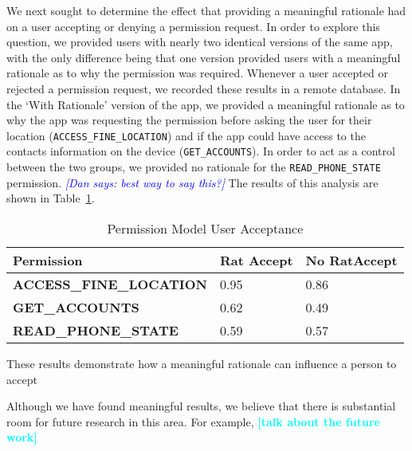 \documentclass{sig-alternate-05-2015}
\newcommand{\todo}[1]{\textcolor{cyan}{\textbf{[#1]}}}
\newcommand{\dan}[1]{\textcolor{blue}{{\it [Dan says: #1]}}}
\begin{document}
We next sought to determine the effect that providing a meaningful rationale had on a user accepting or denying a permission request. In order to explore this question, we provided users with nearly two identical versions of the same app, with the only difference being that one version provided users with a meaningful rationale as to why the permission was required. Whenever a user accepted or rejected a permission request, we recorded these results in a remote database. In the `With Rationale' version of the app, we provided a meaningful rationale as to why the app was requesting the permission before asking the user for their location (\texttt{ACCESS\_FINE\_LOCATION}) and if the app could have access to the contacts information on the device (\texttt{GET\_ACCOUNTS}). In order to act as a control between the two groups, we provided no rationale for the \texttt{READ\_PHONE\_STATE} permission. \dan{best way to say this?} The results of this analysis are shown in Table~\ref{table:permAcceptance}.


\begin{table}[h]
\begin{center}
\caption{Permission Model User Acceptance} %
\label{table:permAcceptance}
\begin{tabular}{l|l|l}


    \bfseries Permission & \bfseries Rat Accept  & \bfseries No RatAccept  \\ \hline\hline
    \bfseries ACCESS\_FINE\_LOCATION & 0.95	 &	0.86  \\ \hline
    \bfseries GET\_ACCOUNTS & 0.62 &	0.49  \\ \hline
    \bfseries READ\_PHONE\_STATE & 0.59  &	0.57  \\ %


\end{tabular}

\end{center}

\end{table}



 These results demonstrate how a meaningful rationale can influence a person to accept



 Although we have found meaningful results, we believe that there is substantial room for future research in this area. For example, \todo{talk about the future work}
\end{document}
